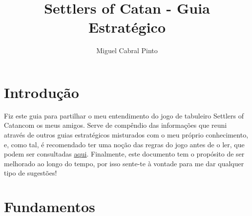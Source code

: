 \documentclass[12pt]{article}
\title{\textbf{Settlers of Catan - Guia Estratégico}}
\author{Miguel Cabral Pinto}
\date{}
\begin{document}
\maketitle
\renewcommand{\contentsname}{Índice}
\tableofcontents
\newpage

\section{Introdução}
Fiz este guia para partilhar o meu entendimento do jogo de tabuleiro Settlers of Catan\texttrademark\space com os meus amigos.
Serve de compêndio das informações que reuni através de outros guias estratégicos misturados com o meu próprio conhecimento, e, como tal, é recomendado ter uma noção das regras do jogo antes de o ler, que podem ser consultadas \href{https://colonist.io/catan-rules}{aqui}. 
Finalmente, este documento tem o propósito de ser melhorado ao longo do tempo, por isso sente-te à vontade para me dar qualquer tipo de sugestões!

\section{Fundamentos}
\end{document}
